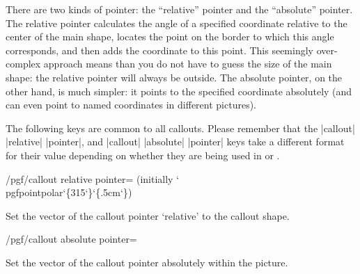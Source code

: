 \begin{codeexample}[]
\end{codeexample}

There are two kinds of pointer:	the ``relative'' pointer and the 
``absolute'' pointer.	The relative pointer calculates the angle of a
specified coordinate relative to the center of the main shape, locates 
the point on the border to which this angle corresponds, and then adds 
the coordinate to this point. This seemingly over-complex approach 
means than you do not have to guess the size of the main shape: the 
relative pointer will always be outside. 
The absolute pointer, on the 
other hand, is much simpler: it points to the specified coordinate
absolutely (and can even point to named coordinates in different 
pictures).


\begin{codeexample}[]
\end{codeexample}


The following keys are common to all callouts. Please remember
that the |callout| |relative| |pointer|, and |callout| |absolute|
|pointer| keys take a different format for their value depending 
on whether they are being used in \pgfname{} or \tikzname{}.
  
  
\begin{key}{/pgf/callout relative pointer= (initially {\ttfamily\char`\\pgfpointpolar\char`\{315\char`\}\char`\{.5cm\char`\}})}
  
  Set the vector of the callout pointer `relative' to the callout 
  shape. 
  
\end{key}

\begin{key}{/pgf/callout absolute pointer=}
  
  Set the vector of the callout pointer absolutely within the picture.
  
\end{key}



